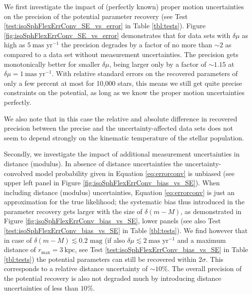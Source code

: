 \documentclass[iop,revtex4,numberedappendix,appendixfloats]{emulateapj}
\begin{document}
We first investigate the impact of (perfectly known) proper motion uncertainties on the precision of the potential parameter recovery (see Test \ref{test:isoSphFlexErrConv_SE_vs_error} in Table \ref{tbl:tests}). Figure \ref{fig:isoSphFlexErrConv_SE_vs_error} demonstrates that for data sets with $\delta \mu$ as high as $5~\text{mas yr}^{-1}$ the precision degrades by  a factor of no more than $\sim2$ as compared to a data set without measurement uncertainties. The precision gets monotonically better for smaller $\delta \mu$, being larger only by a factor of $\sim 1.15$ at $\delta \mu=1~\text{mas yr}^{-1}$. With relative standard errors on the recovered parameters of only a few percent at most for 10,000 stars, this means we still get quite precise constraints on the potential, as long as we know the proper motion uncertainties perfectly.

We also note that in this case the relative and absolute difference in recovered precision between the precise and the uncertainty-affected data sets does not seem to depend strongly on the kinematic temperature of the stellar population.

Secondly, we investigate the impact of additional measurement uncertainties in distance (modulus). In absence of distance uncertainties the uncertainty-convolved model probability given in Equation \eqref{eq:errorconv} is unbiased (see upper left panel in Figure \ref{fig:isoSphFlexErrConv_bias_vs_SE}).  When including distance (modulus) uncertainties, Equation \eqref{eq:errorconv} is just an approximation for the true likelihood; the systematic bias thus introduced in the parameter recovery gets larger with the size of $\delta (m-M)$, as demonstrated in Figure \ref{fig:isoSphFlexErrConv_bias_vs_SE}, lower panels (see also Test \ref{test:isoSphFlexErrConv_bias_vs_SE} in Table \ref{tbl:tests}).  We find however that in case of $\delta(m-M) \lesssim 0.2 \text{ mag}$ (if also $\delta \mu \lesssim 2 ~\text{mas yr}^{-1}$ and a maximum distance of $r_\text{max} = 3~\text{kpc}$, see Test \ref{test:isoSphFlexErrConv_bias_vs_SE} in Table \ref{tbl:tests}) the potential parameters can still be recovered within $2 \sigma$. This corresponds to a relative distance uncertainty of $\sim10\%$. The overall precision of the potential recovery is also not degraded much by introducing distance uncertainties of less than $10\%$.
\end{document}
